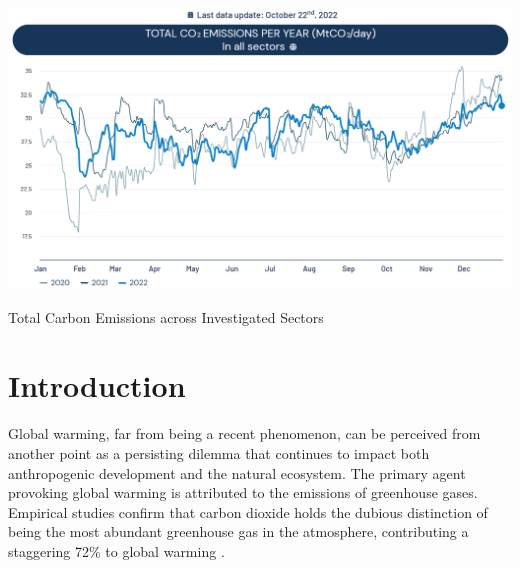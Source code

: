 \documentclass[sigconf, authordraft]{acmart}
\begin{document}
\begin{teaserfigure}
	\includegraphics[width=\textwidth]{figures/total_carbon_emissions.png}
	\caption{Total Carbon Emissions across Investigated Sectors}
	\Description{} \label{fig:teaser}
\end{teaserfigure}

  

\maketitle


\section{Introduction}
Global warming, far from being a recent phenomenon, can be perceived from another
point as a persisting dilemma that continues to impact both anthropogenic development
and the natural ecosystem. The primary agent provoking global warming is
attributed to the emissions of greenhouse gases. Empirical studies confirm that
carbon dioxide holds the dubious distinction of being the most abundant greenhouse
gas in the atmosphere, contributing a staggering 72\% to global warming \cite{li2021-pricing}.
\end{document}
